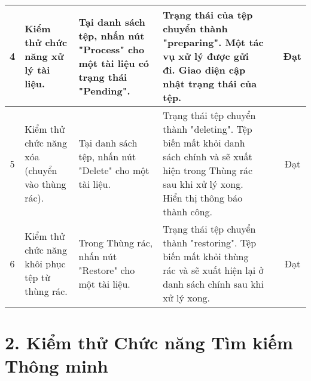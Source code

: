 \documentclass[12pt]{article}
\begin{document}
\begin{longtable}{|c|L{3cm}|L{3.5cm}|L{3.5cm}|L{2.5cm}|c|}
    4 & Kiểm thử chức năng xử lý tài liệu. & 
    Tại danh sách tệp, nhấn nút "Process" cho một tài liệu có trạng thái "Pending". & 
    Trạng thái của tệp chuyển thành "preparing". Một tác vụ xử lý được gửi đi. Giao diện cập nhật trạng thái của tệp. & & Đạt \\
    \hline
    
    5 & Kiểm thử chức năng xóa (chuyển vào thùng rác). &
    Tại danh sách tệp, nhấn nút "Delete" cho một tài liệu. &
    Trạng thái tệp chuyển thành "deleting". Tệp biến mất khỏi danh sách chính và sẽ xuất hiện trong Thùng rác sau khi xử lý xong. Hiển thị thông báo thành công. & & Đạt \\
    \hline

    6 & Kiểm thử chức năng khôi phục tệp từ thùng rác. &
    Trong Thùng rác, nhấn nút "Restore" cho một tài liệu. &
    Trạng thái tệp chuyển thành "restoring". Tệp biến mất khỏi thùng rác và sẽ xuất hiện lại ở danh sách chính sau khi xử lý xong. & & Đạt \\
    \hline

\end{longtable}

\newpage
\section*{2. Kiểm thử Chức năng Tìm kiếm Thông minh}
\end{document}

